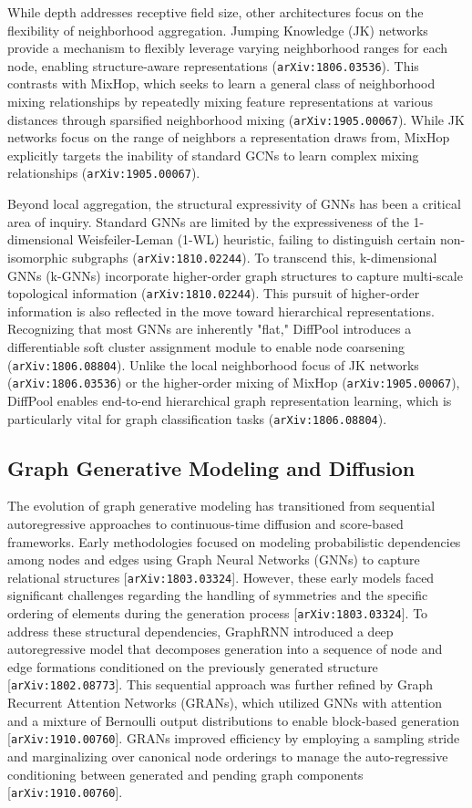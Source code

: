 \documentclass[11pt]{article}
\begin{document}
While depth addresses receptive field size, other architectures focus on the flexibility of neighborhood aggregation. Jumping Knowledge (JK) networks provide a mechanism to flexibly leverage varying neighborhood ranges for each node, enabling structure-aware representations (\texttt{arXiv:1806.03536}). This contrasts with MixHop, which seeks to learn a general class of neighborhood mixing relationships by repeatedly mixing feature representations at various distances through sparsified neighborhood mixing (\texttt{arXiv:1905.00067}). While JK networks focus on the range of neighbors a representation draws from, MixHop explicitly targets the inability of standard GCNs to learn complex mixing relationships (\texttt{arXiv:1905.00067}).

Beyond local aggregation, the structural expressivity of GNNs has been a critical area of inquiry. Standard GNNs are limited by the expressiveness of the 1-dimensional Weisfeiler-Leman (1-WL) heuristic, failing to distinguish certain non-isomorphic subgraphs (\texttt{arXiv:1810.02244}). To transcend this, k-dimensional GNNs (k-GNNs) incorporate higher-order graph structures to capture multi-scale topological information (\texttt{arXiv:1810.02244}). This pursuit of higher-order information is also reflected in the move toward hierarchical representations. Recognizing that most GNNs are inherently "flat," DiffPool introduces a differentiable soft cluster assignment module to enable node coarsening (\texttt{arXiv:1806.08804}). Unlike the local neighborhood focus of JK networks (\texttt{arXiv:1806.03536}) or the higher-order mixing of MixHop (\texttt{arXiv:1905.00067}), DiffPool enables end-to-end hierarchical graph representation learning, which is particularly vital for graph classification tasks (\texttt{arXiv:1806.08804}).

\subsection{Graph Generative Modeling and Diffusion}

The evolution of graph generative modeling has transitioned from sequential autoregressive approaches to continuous-time diffusion and score-based frameworks. Early methodologies focused on modeling probabilistic dependencies among nodes and edges using Graph Neural Networks (GNNs) to capture relational structures [\texttt{arXiv:1803.03324}]. However, these early models faced significant challenges regarding the handling of symmetries and the specific ordering of elements during the generation process [\texttt{arXiv:1803.03324}]. To address these structural dependencies, GraphRNN introduced a deep autoregressive model that decomposes generation into a sequence of node and edge formations conditioned on the previously generated structure [\texttt{arXiv:1802.08773}]. This sequential approach was further refined by Graph Recurrent Attention Networks (GRANs), which utilized GNNs with attention and a mixture of Bernoulli output distributions to enable block-based generation [\texttt{arXiv:1910.00760}]. GRANs improved efficiency by employing a sampling stride and marginalizing over canonical node orderings to manage the auto-regressive conditioning between generated and pending graph components [\texttt{arXiv:1910.00760}].
\end{document}

